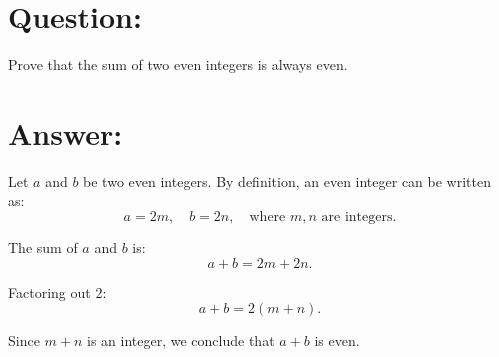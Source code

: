 \documentclass{article}
\begin{document}
\section{Question:}

Prove that the sum of two even integers is always even.

\section{Answer:}

Let $a$ and $b$ be two even integers. By definition, an even integer can be written as:
\begin{equation}
    a = 2m, \quad b = 2n, \quad \text{where } m, n \text{ are integers}.
\end{equation}

The sum of $a$ and $b$ is:
\begin{equation}
    a + b = 2m + 2n.
\end{equation}

Factoring out $2$:
\begin{equation}
    a + b = 2(m + n).
\end{equation}

Since $m + n$ is an integer, we conclude that $a + b$ is even.
\end{document}
